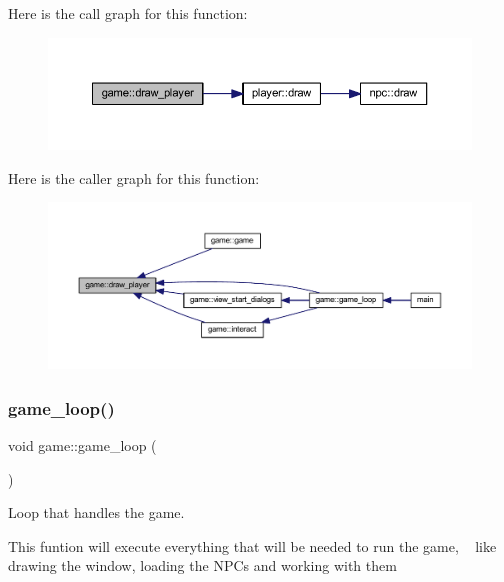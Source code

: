 Here is the call graph for this function\+:
\nopagebreak
\begin{figure}[H]
\begin{center}
\leavevmode
\includegraphics[width=350pt]{classgame_a4982a1c81b1a52b8f050ef48dea86743_cgraph}
\end{center}
\end{figure}
Here is the caller graph for this function\+:
\nopagebreak
\begin{figure}[H]
\begin{center}
\leavevmode
\includegraphics[width=350pt]{classgame_a4982a1c81b1a52b8f050ef48dea86743_icgraph}
\end{center}
\end{figure}
\mbox{\label{classgame_a2b80a1fbc6d723e78d3c86d2f8ff24d4}} 
\subsubsection{\texorpdfstring{game\+\_\+loop()}{game\_loop()}}
{\footnotesize\ttfamily void game\+::game\+\_\+loop (\begin{DoxyParamCaption}{ }\end{DoxyParamCaption})}



Loop that handles the game. 

This funtion will execute everything that will be needed to run the game, ~\newline
like drawing the window, loading the N\+PC\textquotesingle{}s and working with them

